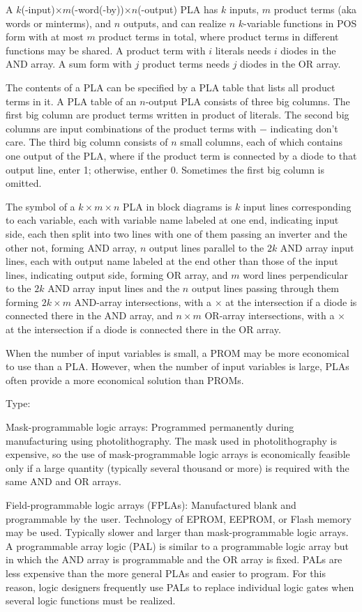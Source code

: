 \documentclass[a4paper,12pt]{report}
\begin{document}
A $k$(-input)$\times m$(-word(-by))$\times n$(-output) PLA has $k$ inputs, $m$ product terms (aka words or minterms), and $n$ outputs, and can realize $n$ $k$-variable functions in POS form with at most $m$ product terms in total, where product terms in different functions may be shared. A product term with $i$ literals needs $i$ diodes in the AND array. A sum form with $j$ product terms needs $j$ diodes in the OR array.

The contents of a PLA can be specified by a PLA table that lists all product terms in it. A PLA table of an $n$-output PLA consists of three big columns. The first big column are product terms written in product of literals. The second big columns are input combinations of the product terms with $-$ indicating don't care. The third big column consists of $n$ small columns, each of which contains one output of the PLA, where if the product term is connected by a diode to that output line, enter 1; otherwise, enther 0. Sometimes the first big column is omitted.

The symbol of a $k\times m\times n$ PLA in block diagrams is $k$ input lines corresponding to each variable, each with variable name labeled at one end, indicating input side, each then split into two lines with one of them passing an inverter and the other not, forming AND array, $n$ output lines parallel to the $2k$ AND array input lines, each with output name labeled at the end other than those of the input lines, indicating output side, forming OR array, and $m$ word lines perpendicular to the $2k$ AND array input lines and the $n$ output lines passing through them forming $2k\times m$ AND-array intersections, with a $\times$ at the intersection if a diode is connected there in the AND array, and $n\times m$ OR-array intersections, with a $\times$ at the intersection if a diode is connected there in the OR array.

When the number of input variables is small, a PROM may be more economical to use than a PLA. However, when the number of input variables is large, PLAs often provide a more economical solution than PROMs.

Type:
\bit
\item Mask-programmable logic arrays: Programmed permanently during manufacturing using photolithography. The mask used in photolithography is expensive, so the use of mask-programmable logic arrays is economically feasible only if a large quantity (typically several thousand or more) is required with the same AND and OR arrays.
\item Field-programmable logic arrays (FPLAs): Manufactured blank and programmable by the user. Technology of EPROM, EEPROM, or Flash memory may be used. Typically slower and larger than mask-programmable logic arrays.
\eit
{}
A programmable array logic (PAL) is similar to a programmable logic array but in which the AND array is programmable and the OR array is fixed. PALs are less expensive than the more general PLAs and easier to program. For this reason, logic designers frequently use PALs to replace individual logic gates when several logic functions must be realized.
\end{document}
